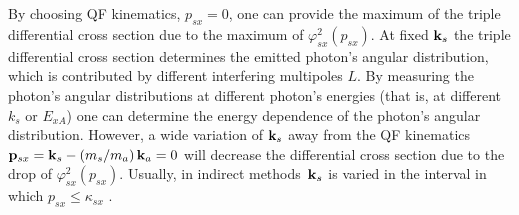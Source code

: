 \documentclass[prl,unsortedaddress,groupedaddress,twocolumn,amsmath,amsfonts,amssymb,showpacs,floatfix,nofootinbib]{revtex4}
\begin{document}
By choosing QF kinematics, $p_{sx}=0$, one can provide the maximum of the triple differential cross section due to the maximum of $\varphi_{sx}^{2}(p_{sx})$. At fixed ${\rm {\bf k}}_{s}$ the triple differential cross section determines the emitted photon's angular distribution, which is contributed by different interfering multipoles $L$.
By measuring the photon's angular distributions at different photon's energies (that is, at different $k_{s}$ or $E_{xA}$) one can determine the energy dependence of the photon's angular distribution. However, a wide variation of ${\rm {\bf k}}_{s}$ 
away from the QF kinematics ${\rm {\bf p}}_{sx} = {\rm {\bf k}}_{s} - (m_{s}/m_{a})\,{\rm {\bf k}}_{a}=0$ will decrease the differential cross section due to the drop of $\varphi_{sx}^{2}(p_{sx})$. Usually, in indirect methods $\,{\rm {\bf k}}_{s}$ is varied in the interval in which $p_{sx} \leq \kappa_{sx}$ \cite{reviewpaper}. \\
\end{document}
